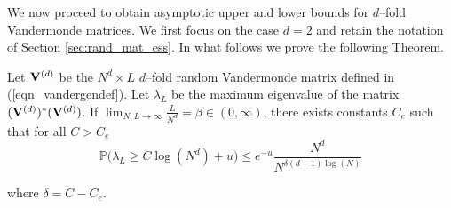 \documentclass[smallextended]{svjour3}
\begin{document}
\par We now proceed to obtain asymptotic upper and lower bounds for $d$--fold Vandermonde matrices. We first focus on the case $d=2$ and retain the notation of Section \ref{sec:rand_mat_ess}. In what follows we
prove the following Theorem.
\begin{theorem}
Let ${\bf V}^{(d)}$ be the $N^{d}\times L$ $d$--fold random Vandermonde matrix defined in (\ref{eqn_vandergendef}). Let $\lambda_L$ be the maximum eigenvalue of the matrix $({\bf V}^{(d)})^{*} ({\bf V}^{(d)})$. If $\lim_{N,L\to\infty}\frac{L}{N^{d}}=\beta \in (0,\infty)$,
there exists constants $C_e$ such that for all $C > C_e$
\begin{equation}\label{eqn_maxupperbnd}
\mathbb{P} \Big(\lambda_L \geq C\log(N^d) + u \Big) \leq e^{-u} \frac{N^d}{N^{\delta (d-1)\log(N)}}
\end{equation}
\end{theorem}
where $\delta = C - C_e$.
\end{document}
